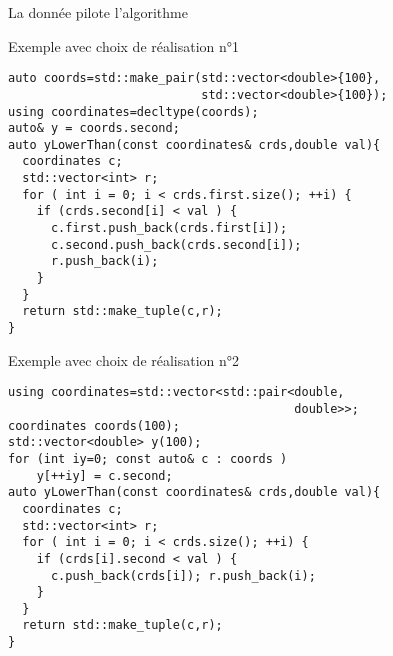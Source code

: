 \documentclass[compress,10pt,aspectratio=169]{beamer}
\begin{document}
\begin{frame}[fragile]{La donnée pilote l'algorithme}
  \scriptsize
\begin{multicols}{2}
\begin{minipage}{0.5\textwidth}
\begin{block}{\small Exemple avec choix de réalisation n°1}
\begin{verbatim}
auto coords=std::make_pair(std::vector<double>{100},
                           std::vector<double>{100});
using coordinates=decltype(coords);
auto& y = coords.second;
auto yLowerThan(const coordinates& crds,double val){
  coordinates c; 
  std::vector<int> r;
  for ( int i = 0; i < crds.first.size(); ++i) {
    if (crds.second[i] < val ) {
      c.first.push_back(crds.first[i]); 
      c.second.push_back(crds.second[i]);
      r.push_back(i);
    }
  }
  return std::make_tuple(c,r);
}
\end{verbatim}
\end{block}
\end{minipage}
\columnbreak
\begin{minipage}{0.5\textwidth}
\begin{exampleblock}{\small Exemple avec choix de réalisation n°2}
\begin{verbatim}
using coordinates=std::vector<std::pair<double,
                                        double>>;
coordinates coords(100);
std::vector<double> y(100); 
for (int iy=0; const auto& c : coords ) 
    y[++iy] = c.second;
auto yLowerThan(const coordinates& crds,double val){
  coordinates c; 
  std::vector<int> r; 
  for ( int i = 0; i < crds.size(); ++i) {
    if (crds[i].second < val ) {
      c.push_back(crds[i]); r.push_back(i);
    }  
  }
  return std::make_tuple(c,r); 
}
\end{verbatim}
\end{exampleblock}
\end{minipage}
\end{multicols}
\end{frame}
\end{document}
